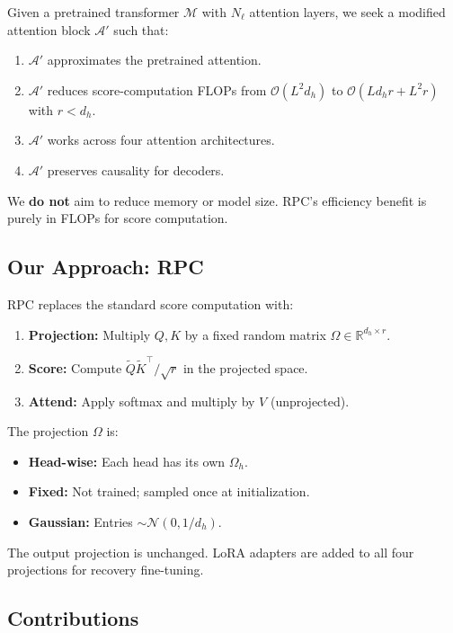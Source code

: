 Given a pretrained transformer $\mathcal{M}$ with $N_\ell$ attention layers, 
we seek a modified attention block $\mathcal{A}'$ such that:

\begin{enumerate}
\item $\mathcal{A}'$ approximates the pretrained attention.
\item $\mathcal{A}'$ reduces score-computation FLOPs from $\mathcal{O}(L^2 d_h)$
  to $\mathcal{O}(L d_h r + L^2 r)$ with $r < d_h$.
\item $\mathcal{A}'$ works across four attention architectures.
\item $\mathcal{A}'$ preserves causality for decoders.

\end{enumerate}
We \textbf{do not} aim to reduce memory or model size. RPC's efficiency benefit 
is purely in FLOPs for score computation.

\subsection{Our Approach: RPC}

RPC replaces the standard score computation with:

\begin{enumerate}
\item \textbf{Projection:} Multiply $Q, K$ by a fixed random matrix $\Omega \in \mathbb{R}^{d_h \times r}$.
\item \textbf{Score:} Compute $\tilde{Q} \tilde{K}^\top / \sqrt{r}$ in the projected space.
\item \textbf{Attend:} Apply softmax and multiply by $V$ (unprojected).

\end{enumerate}
The projection $\Omega$ is:
\begin{itemize}
\item \textbf{Head-wise:} Each head has its own $\Omega_h$.
\item \textbf{Fixed:} Not trained; sampled once at initialization.
\item \textbf{Gaussian:} Entries $\sim \mathcal{N}(0, 1/d_h)$.

\end{itemize}
The output projection is unchanged. LoRA adapters are added to all four 
projections for recovery fine-tuning.

\subsection{Contributions}

